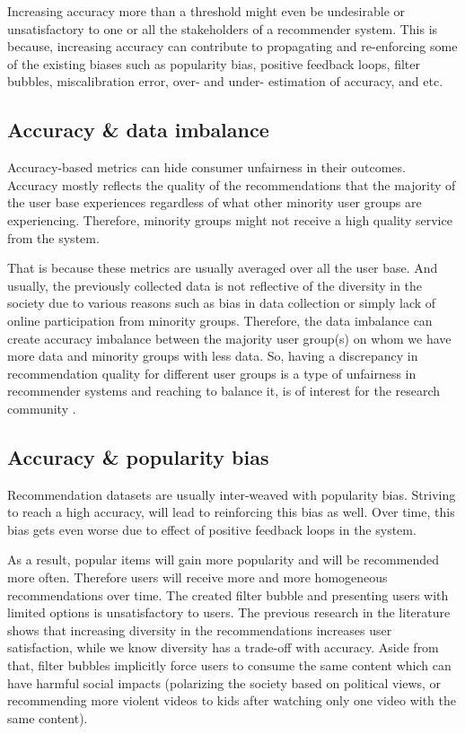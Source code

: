 Increasing accuracy more than a threshold might even be undesirable or unsatisfactory to one or all the stakeholders of a recommender system. This is because, increasing accuracy can contribute to propagating and re-enforcing some of the existing biases such as popularity bias, positive feedback loops, filter bubbles, miscalibration error, over- and under- estimation of accuracy, and etc. 


\subsection{Accuracy \& data imbalance}
Accuracy-based metrics can hide consumer unfairness in their outcomes. Accuracy mostly reflects the quality of the recommendations that the majority of the user base experiences regardless of what other minority user groups are experiencing. Therefore, minority groups might not receive a high quality service from the system. 

That is because these metrics are usually averaged over all the user base. And usually, the previously collected data is not reflective of the diversity in the society due to various reasons such as bias in data collection or simply lack of online participation from minority groups. Therefore, the data imbalance can create accuracy imbalance between the majority user group(s) on whom we have more data and minority groups with less data. So, having a discrepancy in recommendation quality for different user groups is a type of unfairness  in recommender systems and reaching to balance it, is of interest for the research community \cite{ekstrand2018all,yao2017beyond}.


\subsection{Accuracy \& popularity bias}
Recommendation datasets are usually inter-weaved with popularity bias. Striving to reach a high accuracy, will lead to reinforcing this bias as well. Over time, this bias gets even worse due to effect of positive feedback loops in the system.

As a result, popular items will gain more popularity and will be recommended more often. 
Therefore users will receive more and more homogeneous recommendations over time. The created filter bubble and presenting users with limited options is unsatisfactory to users. The previous research in the literature shows that increasing diversity in the recommendations increases user satisfaction, while we know diversity has a trade-off with accuracy. Aside from that, filter bubbles implicitly force users to consume the same content which can have harmful social impacts (polarizing the society based on political views, or recommending more violent videos to kids after watching only one video with the same content). 

